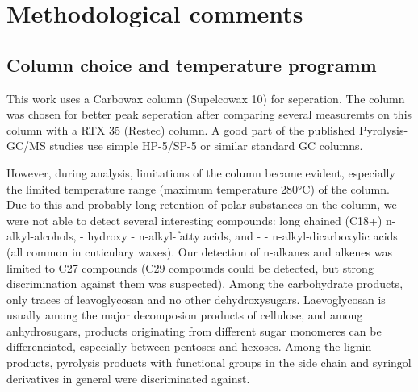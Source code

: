 % 
% 
% 
% 



\chapter{Methodological comments}

\section{Column choice and temperature programm}
This work uses a Carbowax column (Supelcowax 10) for seperation. The column was chosen for better peak seperation after comparing several measuremts on this column with a RTX 35 (Restec) column. A good part of the published Pyrolysis-GC/MS studies use simple HP-5/SP-5 or similar standard GC columns.

However, during analysis, limitations of the column became evident, especially the limited temperature range (maximum temperature 280°C) of the column. Due to this and probably long retention of polar substances on the column, we were not able to detect several interesting compounds: long chained (C18+) n-alkyl-alcohols, \textomega - hydroxy - n-alkyl-fatty acids, and \textalpha - \textomega - n-alkyl-dicarboxylic acids (all common in cuticulary waxes). Our detection of n-alkanes and alkenes was limited to C27 compounds (C29 compounds could be detected, but strong discrimination against them was suspected). Among the carbohydrate products, only traces of leavoglycosan and no other dehydroxysugars. Laevoglycosan is usually among the major decomposion products of cellulose, and among anhydrosugars, products originating from different sugar monomeres can be differenciated, especially between pentoses and hexoses. 
Among the lignin products, pyrolysis products with functional groups in the side chain and syringol derivatives in general were discriminated against. 

